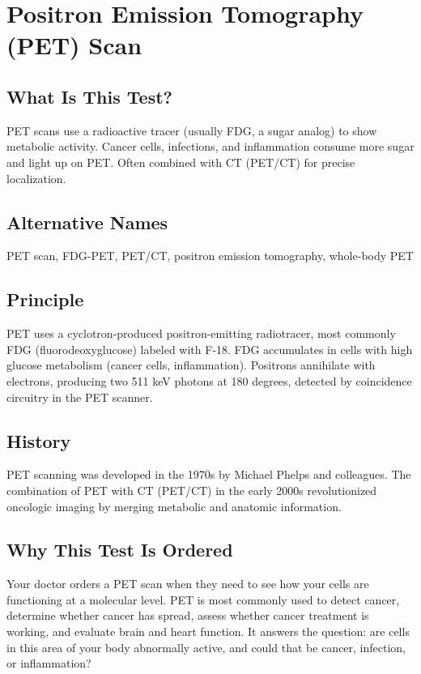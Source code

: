 \chapter{Positron Emission Tomography (PET) Scan}

\section*{What Is This Test?}
PET scans use a radioactive tracer (usually FDG, a sugar analog) to show metabolic activity. Cancer cells, infections, and inflammation consume more sugar and light up on PET. Often combined with CT (PET/CT) for precise localization.

\section*{Alternative Names}
PET scan, FDG-PET, PET/CT, positron emission tomography, whole-body PET


\section*{Principle}
PET uses a cyclotron-produced positron-emitting radiotracer, most commonly FDG (fluorodeoxyglucose) labeled with F-18. FDG accumulates in cells with high glucose metabolism (cancer cells, inflammation). Positrons annihilate with electrons, producing two 511 keV photons at 180 degrees, detected by coincidence circuitry in the PET scanner.

\section*{History}
PET scanning was developed in the 1970s by Michael Phelps and colleagues. The combination of PET with CT (PET/CT) in the early 2000s revolutionized oncologic imaging by merging metabolic and anatomic information.

\section*{Why This Test Is Ordered}
Your doctor orders a PET scan when they need to see how your cells are functioning at a molecular level. PET is most commonly used to detect cancer, determine whether cancer has spread, assess whether cancer treatment is working, and evaluate brain and heart function. It answers the question: are cells in this area of your body abnormally active, and could that be cancer, infection, or inflammation?

